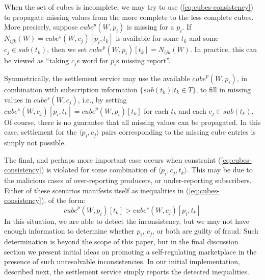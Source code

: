 \documentclass[chi_draft]{sigchi}
\begin{document}
{When the set of cubes is incomplete, we may try to use (\ref{eq:cubes-consistency}) to propagate missing values from the more complete to the less complete cubes. 
More precisely, suppose $ \mathit{cube}^p(W, p_i) $ is missing for a $p_i$.
If $ N_{ijk}(W) = \mathit{cube^s}(W, c_j)[p_i, t_k] $ is available for some $t_k$ and some $ c_j \in \mathit{sub}(t_k) $, then we set $  \mathit{cube}^p(W, p_i)[t_k]=  N_{ijk}(W) $.
In practice, this can be viewed as ``taking $ c_j $s word for $p_i$s missing report''.

Symmetrically, the settlement service may use the available $ \mathit{cube}^p(W, p_i)$, in combination with subscription information $ \{\mathit{sub}(t_k) | t_k \in T \}$, to fill in missing values in 
$  \mathit{cube^s}(W, c_j)  $, i.e., by setting 
$ \mathit{cube^s}(W, c_j)[p_i, t_k]  =  \mathit{cube}^p(W, p_i)[t_k]$ for each $t_k$ and each $c_j \in \mathit{sub}(t_k)$.
%
Of course, there is no guarantee that all missing values can be propagated. 
In this case, settlement for the $\langle p_i, c_j \rangle$ pairs corresponding to the missing cube entries is simply not possible.

The final, and perhaps more important case occurs when constraint (\ref{eq:cubes-consistency}) is violated for some combination of $\langle p_i, c_j, t_k \rangle$.
This may be due to the malicious cases of over-reporting producers, or under-reporting subscribers.
%
Either of these  scenarios manifests itself as inequalities in (\ref{eq:cubes-consistency}), of the form:
\begin{equation}\label{eq:inconsistencies}
\mathit{cube}^p(W, p_i)[t_k] > \mathit{cube^s}(W, c_j)[p_i, t_k]
\end{equation}
In this situation, we are able to detect the inconsistency, but we may not have enough information to determine whether $p_i$, $c_j$, or both are guilty of fraud.
Such determination is beyond the scope of this paper, but in the final discussion section we present initial ideas on promoting a self-regulating marketplace in the presence of such unresolvable inconsistencies.
%
In our initial implementation, described next, the settlement service simply reports the detected inequalities.



}
\end{document}
